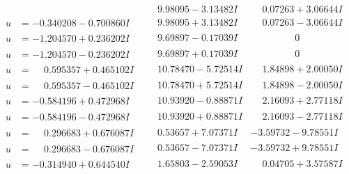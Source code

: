 \documentclass[1p]{elsarticle_modified}
\theoremstyle{definition}
\begin{document}
$$\begin{array}{c|c|c}
 & \phantom{-}9.98095 - 3.13482 I & \phantom{-}0.07263 + 3.06644 I \\ \hline\begin{aligned}
u &= -0.340208 - 0.700860 I\end{aligned}
 & \phantom{-}9.98095 + 3.13482 I & \phantom{-}0.07263 - 3.06644 I \\ \hline\begin{aligned}
u &= -1.204570 + 0.236202 I\end{aligned}
 & \phantom{-}9.69897 - 0.17039 I & \phantom{-0.000000 } 0 \\ \hline\begin{aligned}
u &= -1.204570 - 0.236202 I\end{aligned}
 & \phantom{-}9.69897 + 0.17039 I & \phantom{-0.000000 } 0 \\ \hline\begin{aligned}
u &= \phantom{-}0.595357 + 0.465102 I\end{aligned}
 & \phantom{-}10.78470 - 5.72514 I & \phantom{-}1.84898 + 2.00050 I \\ \hline\begin{aligned}
u &= \phantom{-}0.595357 - 0.465102 I\end{aligned}
 & \phantom{-}10.78470 + 5.72514 I & \phantom{-}1.84898 - 2.00050 I \\ \hline\begin{aligned}
u &= -0.584196 + 0.472968 I\end{aligned}
 & \phantom{-}10.93920 - 0.88871 I & \phantom{-}2.16093 + 2.77118 I \\ \hline\begin{aligned}
u &= -0.584196 - 0.472968 I\end{aligned}
 & \phantom{-}10.93920 + 0.88871 I & \phantom{-}2.16093 - 2.77118 I \\ \hline\begin{aligned}
u &= \phantom{-}0.296683 + 0.676087 I\end{aligned}
 & \phantom{-}0.53657 + 7.07371 I & -3.59732 - 9.78551 I \\ \hline\begin{aligned}
u &= \phantom{-}0.296683 - 0.676087 I\end{aligned}
 & \phantom{-}0.53657 - 7.07371 I & -3.59732 + 9.78551 I \\ \hline\begin{aligned}
u &= -0.314940 + 0.644540 I\end{aligned}
 & \phantom{-}1.65803 - 2.59053 I & \phantom{-}0.04705 + 3.57587 I \\ \hline\begin{aligned}

\end{aligned}
\end{array}$$
\end{document}
